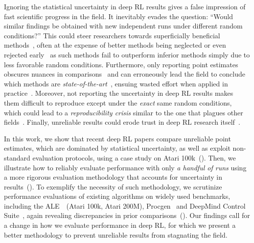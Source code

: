 Ignoring the statistical uncertainty in deep RL results gives a false impression of fast scientific progress in the field. %
It inevitably evades the question: ``Would similar findings be obtained with new independent runs under different random conditions?''
This could steer researchers towards superficially beneficial methods~\citep{bouthillier2019unreproducible, dodge2020fine, bouthillier2021accounting}, often at the expense of better methods being neglected or even rejected early~\citep{melis2018state, lucic2017gans} as such methods fail to outperform inferior methods simply due to less favorable random conditions. Furthermore, only reporting point estimates obscures nuances in comparisons~\citep{ritter2017cognitive} and can erroneously lead the field to conclude which methods are \emph{state-of-the-art}~\citep{lin2021significant, reimers2017reporting}, ensuing wasted effort 
when applied in practice~\citep{varoquaux2021failed}. Moreover, not reporting the uncertainty in deep RL results makes them difficult to reproduce except under the \emph{exact} same random conditions, %
which could lead to a \emph{reproducibility crisis} similar to the one that plagues other fields~\citep{ioannidis2005most, pashler2012editors, baker20161}. 
Finally, unreliable results could erode trust in deep RL research itself~\citep{rlblogpost}.%

In this work, we show that recent deep RL papers compare unreliable point estimates, which are dominated by statistical uncertainty, as well as exploit non-standard evaluation protocols, using a case study on Atari 100k~(). Then, we illustrate how to reliably evaluate performance with only \emph{a handful of runs} using a more rigorous evaluation methodology that accounts for uncertainty in results~().
To exemplify the necessity of such methodology, we scrutinize performance evaluations of existing algorithms on widely used benchmarks, including the ALE~\citep{bellemare2013arcade}~(Atari 100k, Atari 200M), Procgen~\citep{cobbe2020leveraging} and DeepMind Control Suite~\citep{tassa2018deepmind}, again revealing discrepancies in prior comparisons~(). Our findings call for a change in how we evaluate performance in deep RL, for which we present a better methodology to prevent unreliable results from stagnating the field.

